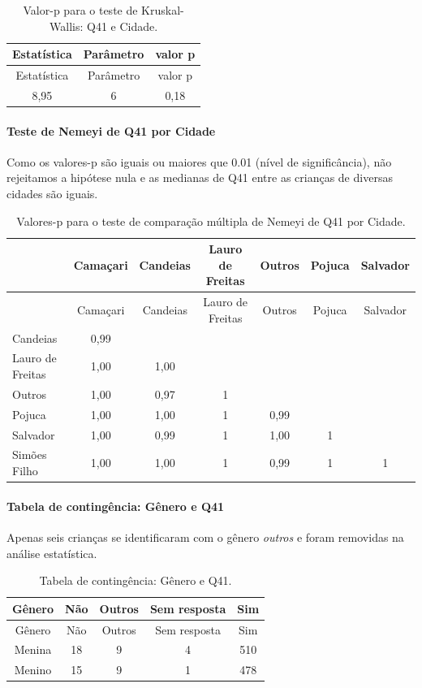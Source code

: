 \documentclass[]{article}
\let\oldparagraph\paragraph
\renewcommand{\paragraph}[1]{\oldparagraph{#1}\mbox{}}
\begin{document}
\begin{longtable}[]{@{}ccc@{}}
\caption{\label{tab:unnamed-chunk-1612}Valor-p para o teste de Kruskal-Wallis: Q41 e Cidade.}\tabularnewline
\toprule
Estatística & Parâmetro & valor p\tabularnewline
\midrule
\endfirsthead
\toprule
Estatística & Parâmetro & valor p\tabularnewline
\midrule
\endhead
8,95 & 6 & 0,18\tabularnewline
\bottomrule
\end{longtable}

\hypertarget{teste-de-nemeyi-de-q41-por-cidade}{%
\paragraph{Teste de Nemeyi de Q41 por Cidade}\label{teste-de-nemeyi-de-q41-por-cidade}}

Como os valores-p são iguais ou maiores que 0.01 (nível de significância), não rejeitamos a hipótese nula e as medianas de Q41 entre as crianças de diversas cidades são iguais.

\begin{longtable}[]{@{}lcccccc@{}}
\caption{\label{tab:unnamed-chunk-1614}Valores-p para o teste de comparação múltipla de Nemeyi de Q41 por Cidade.}\tabularnewline
\toprule
& Camaçari & Candeias & Lauro de Freitas & Outros & Pojuca & Salvador\tabularnewline
\midrule
\endfirsthead
\toprule
& Camaçari & Candeias & Lauro de Freitas & Outros & Pojuca & Salvador\tabularnewline
\midrule
\endhead
Candeias & 0,99 & & & & &\tabularnewline
Lauro de Freitas & 1,00 & 1,00 & & & &\tabularnewline
Outros & 1,00 & 0,97 & 1 & & &\tabularnewline
Pojuca & 1,00 & 1,00 & 1 & 0,99 & &\tabularnewline
Salvador & 1,00 & 0,99 & 1 & 1,00 & 1 &\tabularnewline
Simões Filho & 1,00 & 1,00 & 1 & 0,99 & 1 & 1\tabularnewline
\bottomrule
\end{longtable}

\cleardoublepage

\hypertarget{tabela-de-continguxeancia-guxeanero-e-q41}{%
\paragraph{Tabela de contingência: Gênero e Q41}\label{tabela-de-continguxeancia-guxeanero-e-q41}}

Apenas seis crianças se identificaram com o gênero \emph{outros} e foram removidas na análise estatística.

\begin{longtable}[]{@{}ccccc@{}}
\caption{\label{tab:unnamed-chunk-1615}Tabela de contingência: Gênero e Q41.}\tabularnewline
\toprule
Gênero & Não & Outros & Sem resposta & Sim\tabularnewline
\midrule
\endfirsthead
\toprule
Gênero & Não & Outros & Sem resposta & Sim\tabularnewline
\midrule
\endhead
Menina & 18 & 9 & 4 & 510\tabularnewline
Menino & 15 & 9 & 1 & 478\tabularnewline
\bottomrule
\end{longtable}
\end{document}
